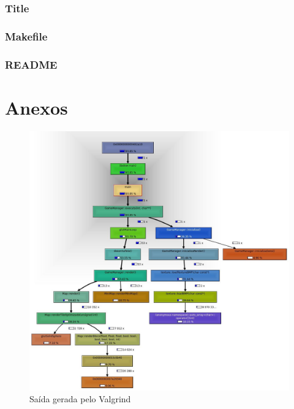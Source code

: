 \subsubsection{Title}

\subsubsection{Makefile}

\subsubsection{README}\label{README}


\onecolumn
\section{Anexos}\label{anexo}

\begin{figure}[h]
	\centering
	\includegraphics [scale=0.5,angle=0,keepaspectratio=true]{./fts/callgrind/img3}
	\caption{Saída gerada pelo Valgrind}
	\label{valgrind}
\end{figure}



